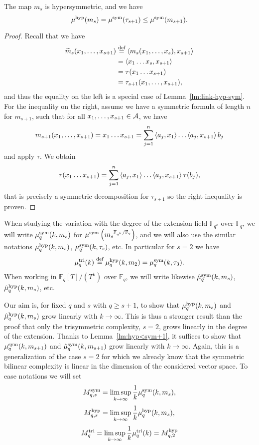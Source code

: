 \begin{lm}
\label{lm:hyp<sym+1}
The map $m_s$ is hypersymmetric, and we have
\[
\mu^{\textrm{hyp}}(m_s)=\mu^{\textrm{sym}}(\tau_{s+1})\leq\mu^{\textrm{sym}}(m_{s+1}).
\] 
\end{lm}
\begin{proof}
Recall that we have 
\begin{align*}
  \widetilde{m}_s(x_1, \dots, x_{s+1}) &\overset{\text{def}}{=} \left\langle m_s(x_1, \dots, x_s),x_{s+1}\right\rangle \\
  &= \left\langle x_1\dots x_{s},x_{s+1}\right\rangle\\
  &= \tau(x_1\dots x_{s+1})\\
  &=\tau_{s+1}(x_1, \dots, x_{s+1}),
\end{align*}
and thus the equality on the left is a special case of Lemma~\ref{lm:link-hyp-sym}.
For the inequality on the right, assume we have a symmetric formula of length
$n$ for $m_{s+1}$, such that for all $x_1, \dots, x_{s+1}\in\mathcal{A}$, we have
\[
  m_{s+1}(x_1, \dots, x_{s+1})= x_1\dots x_{s+1} = \sum_{j=1}^{n}
  \left\langle a_j,x_1\right\rangle\dots\left\langle a_j,x_{s+1}\right\rangle b_j
\]
and apply $\tau$. We obtain
\[
  \tau(x_1\dots x_{s+1})=
  \sum_{j=1}^n\left\langle a_j,x_1\right\rangle\dots\left\langle a_j,x_{s+1}\right\rangle\tau(b_j),
\]
that is precisely a symmetric decomposition for $\tau_{s+1}$ so the right
inequality is proven.
\end{proof}

When studying the variation with the degree of the extension field
$\mathbb{F}_{q^k}$ over $\mathbb{F}_q$, we will write $\mu^{\textrm{sym}}_q(k,m_s)$ for
$\mu^{\textrm{sym}}\left({m_s}^{\mathbb{F}_{q^k}/\mathbb{F}_q}\right)$, and we will also use
the similar notations $\mu^{\textrm{hyp}}_q(k,m_s)$, $\mu^{\textrm{sym}}_q(k,\tau_s)$, etc. In
particular for $s=2$ we have
\[
\mu^{\textrm{tri}}_q(k)\overset{\text{def}}{=}\mu^{\textrm{hyp}}_q(k,m_2)=\mu^{\textrm{sym}}_q(k,\tau_3).
\]
When working in $\mathbb{F}_q[T]/(T^k)$ over $\mathbb{F}_q$,
we will write likewise $\hat\mu^{\textrm{sym}}_q(k,m_s)$, $\hat\mu^{\textrm{hyp}}_q(k,m_s)$, etc.

Our aim is, for fixed $q$ and $s$ with $q\geq s+1$, to show that
$\mu^{\textrm{hyp}}_q(k,m_s)$ and $\hat\mu^{\textrm{hyp}}_q(k,m_s)$ grow linearly with $k\to\infty$. This
is thus a stronger result than the proof that only the trisymmetric complexity,
\ie $s=2$, grows linearly in the degree of the extension.
Thanks to Lemma~\ref{lm:hyp<sym+1}, it suffices to show that
$\mu^{\textrm{sym}}_q(k,m_{s+1})$ and $\hat\mu^{\textrm{sym}}_q(k,m_{s+1})$ grow linearly with
$k\to\infty$. Again, this is a generalization of the case $s=2$ for which we
already know that the symmetric bilinear complexity is linear in the dimension
of the considered vector space. To ease notations we will set
\[
M^{\textrm{sym}}_{q,s}=\limsup_{k\to\infty}\frac{1}{k}\mu^{\textrm{sym}}_q(k,m_s),
\]
\[
  M^{\textrm{hyp}}_{q,s}=\limsup_{k\to\infty}\frac{1}{k}\mu^{\textrm{hyp}}_q(k,m_s),
\]
\[
M^{\textrm{tri}}_q=\limsup_{k\to\infty}\frac{1}{k}\mu^{\textrm{tri}}_q(k)=M^{\textrm{hyp}}_{q,2}
\]

